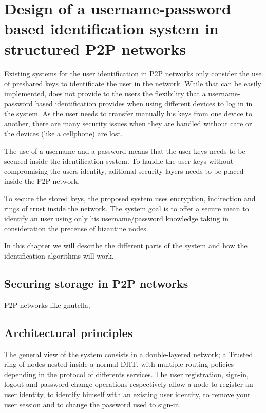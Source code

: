 \chapter{Design of a username-password based identification system in structured P2P networks}

Existing systems for the user identification in P2P networks only consider the
use of preshared keys to identificate the user in the network. While that can
be easily implemented, does not provide to the users the flexibility that a
username-password based identification provides when using different devices to
log in in the system. As the user needs to transfer manually his keys from one
device to another, there are many security issues when they are handled without
care or the devices (like a cellphone) are lost. 

The use of a username and a password means that the user keys needs to be secured inside the identification system.
To handle the user keys without compromising the users identity, aditional
security layers needs to be placed inside the P2P network.

To secure the stored keys, the proposed system uses encryption, indirection and
rings of trust inside the network. The system goal is to offer a secure mean to
identify an user using only his username/password knowledge taking in
consideration the precense of bizantine nodes.

In this chapter we will describe the different parts of the system and how the
identification algorithms will work.

\section{Securing storage in P2P networks}
P2P networks like gnutella,


\section{Architectural principles}
The general view of the system consists in a double-layered network; a Trusted
ring of nodes nested inside a normal DHT, with multiple routing policies
depending in the protocol of differents services. The user registration,
sign-in, logout and password change operations respectively allow a node to
register an user identity, to identify himself with an existing user identity,
to remove your user session and to change the password used to sign-in.

